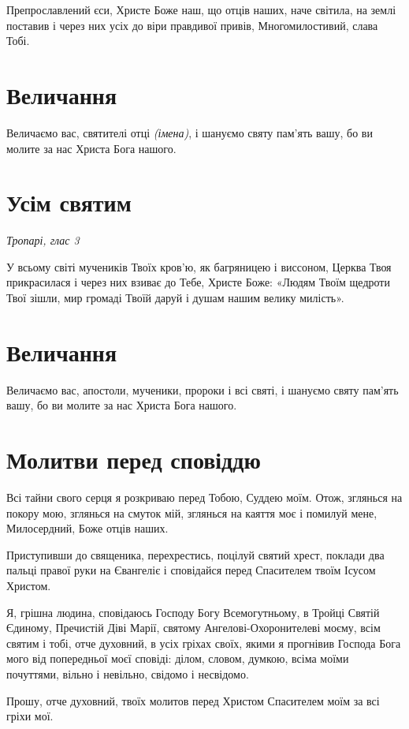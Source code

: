 \documentclass[chapters.tex]{subfiles}
\begin{document}
Препрославлений єси, Христе Боже наш, що отців наших, наче світила, на землі поставив і через них усіх до віри правдивої привів, Многомилостивий, слава Тобі.

\section{Величання}

Величаємо вас, святителі отці \emph{(імена)}, і шануємо святу пам’ять вашу, бо ви молите за нас Христа Бога нашого.

\section{Усім святим}
\emph{Тропарі, глас 3}

У всьому світі мучеників Твоїх кров’ю, як багряницею і виссоном, Церква Твоя прикрасилася і через них взиває до Тебе, Христе Боже: «Людям Твоїм щедроти Твої зішли, мир громаді Твоїй даруй і душам нашим велику милість».

\section{Величання}

Величаємо вас, апостоли, мученики, пророки і всі святі, і шануємо святу пам’ять вашу, бо ви молите за нас Христа Бога нашого.

\section{Молитви перед сповіддю}
Всі тайни свого серця я розкриваю перед Тобою, Суддею моїм. Отож, зглянься на покору мою, зглянься на смуток мій, зглянься на каяття моє і помилуй мене, Милосердний, Боже отців наших.

Приступивши до священика, перехрестись, поцілуй святий хрест, поклади два пальці правої руки на Євангеліє і сповідайся перед Спасителем твоїм Ісусом Христом.

Я, грішна людина, сповідаюсь Господу Богу Всемогутньому, в Тройці Святій Єдиному, Пречистій Діві Марії, святому Ангелові-Охоронителеві моєму, всім святим і тобі, отче духовний, в усіх гріхах своїх, якими я прогнівив Господа Бога мого від попередньої моєї сповіді: ділом, словом, думкою, всіма моїми почуттями, вільно і невільно, свідомо і несвідомо.

Прошу, отче духовний, твоїх молитов перед Христом Спасителем моїм за всі гріхи мої.
\end{document}
